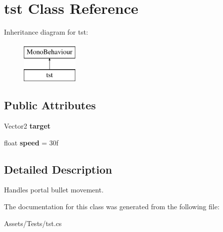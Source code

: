 \hypertarget{classtst}{}\section{tst Class Reference}
\label{classtst}
Inheritance diagram for tst\+:\begin{figure}[H]
\begin{center}
\leavevmode
\includegraphics[height=2.000000cm]{classtst}
\end{center}
\end{figure}
\subsection*{Public Attributes}
\begin{DoxyCompactItemize}
\item 
\mbox{\label{classtst_a551cd6bce0f73548b1cc22b53efe7199}} 
Vector2 {\bfseries target}
\item 
\mbox{\label{classtst_aacda5fb44d6cb6081c0c5885825d2568}} 
float {\bfseries speed} = 30f
\end{DoxyCompactItemize}


\subsection{Detailed Description}
Handles portal bullet movement. 

The documentation for this class was generated from the following file\+:\begin{DoxyCompactItemize}
\item 
Assets/\+Tests/tst.\+cs\end{DoxyCompactItemize}

